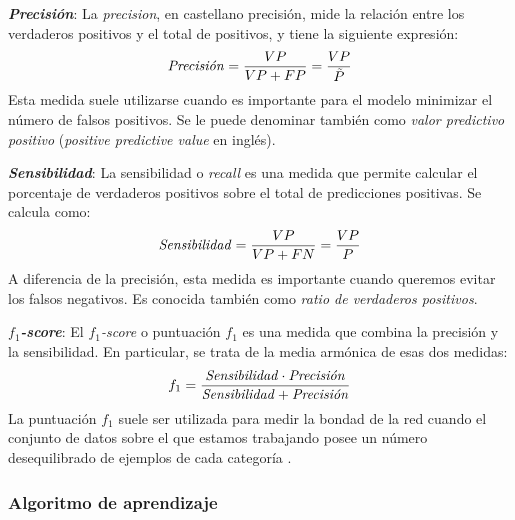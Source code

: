 \vspace{10pt}\textbf{\textit{Precisión}}: La \textit{precision}, en castellano precisión, mide la relación entre los
verdaderos positivos y el total de positivos, y tiene la siguiente expresión:
\begin{equation}
    \text{\textit{Precisión}}=\frac{VP}{VP+FP}=\frac{VP}{\tilde{P}}
\end{equation}
Esta medida suele utilizarse cuando es importante para el modelo minimizar el número de falsos positivos. Se le puede
denominar también como \textit{valor predictivo positivo} (\textit{positive predictive value} en inglés).

\vspace{10pt}\textbf{\textit{Sensibilidad}}: La sensibilidad o \textit{recall} es una medida que permite calcular el 
porcentaje de verdaderos positivos sobre el total de predicciones positivas. Se calcula como:
\begin{equation}
    \text{\textit{Sensibilidad}}=\frac{VP}{VP+FN}=\frac{VP}{P}
\end{equation}
A diferencia de la precisión, esta medida es importante cuando queremos evitar los falsos negativos. Es conocida también
como \textit{ratio de verdaderos positivos}.

\vspace{10pt}\textbf{\textit{$f_1$-score}}: El \textit{$f_1$-score} o puntuación $f_1$ es una medida que combina la
precisión y la sensibilidad. En particular, se trata de la media armónica de esas dos medidas:
\begin{equation}
    f_1=\frac{\text{\textit{Sensibilidad}}
\cdot\text{\textit{Precisión}}}{\text{\textit{Sensibilidad}}+\text{\textit{Precisión}}}
\end{equation}
La puntuación $f_1$ suele ser utilizada para medir la bondad de la red cuando el conjunto de datos sobre el que estamos
trabajando posee un número desequilibrado de ejemplos de cada categoría \cite{muller_guido_2017}.

\subsubsection*{Algoritmo de aprendizaje}

